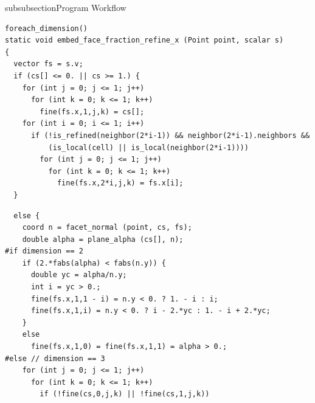 \begin{codesection}{subsubsection}{Program Workflow}
\begin{verbatim}
foreach_dimension()
static void embed_face_fraction_refine_x (Point point, scalar s)
{
  vector fs = s.v;
  if (cs[] <= 0. || cs >= 1.) {
    for (int j = 0; j <= 1; j++)
      for (int k = 0; k <= 1; k++)
        fine(fs.x,1,j,k) = cs[];
    for (int i = 0; i <= 1; i++)
      if (!is_refined(neighbor(2*i-1)) && neighbor(2*i-1).neighbors &&
          (is_local(cell) || is_local(neighbor(2*i-1))))
        for (int j = 0; j <= 1; j++)
          for (int k = 0; k <= 1; k++)
            fine(fs.x,2*i,j,k) = fs.x[i];
  }
\end{verbatim}
\codearrow
{}
\begin{verbatim}
  else {
    coord n = facet_normal (point, cs, fs);
    double alpha = plane_alpha (cs[], n);
#if dimension == 2
    if (2.*fabs(alpha) < fabs(n.y)) {
      double yc = alpha/n.y;
      int i = yc > 0.;
      fine(fs.x,1,1 - i) = n.y < 0. ? 1. - i : i;
      fine(fs.x,1,i) = n.y < 0. ? i - 2.*yc : 1. - i + 2.*yc;
    }
    else
      fine(fs.x,1,0) = fine(fs.x,1,1) = alpha > 0.;
#else // dimension == 3
    for (int j = 0; j <= 1; j++)
      for (int k = 0; k <= 1; k++)
        if (!fine(cs,0,j,k) || !fine(cs,1,j,k))

\end{verbatim}
\end{codesection}
